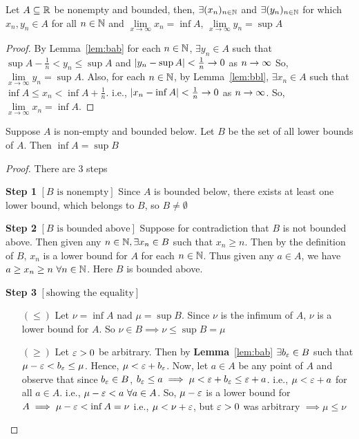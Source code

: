\begin{corollary}
    Let $A\subseteq \mathbb R$ be nonempty and bounded, then, $\exists(x_n)_{n\in\mathbb N}$ and $\exists(y_n)_{n\in\mathbb N}$ 
    for which $x_n, y_n \in A$ for all $n \in \mathbb N$ and
    $\lim\limits_{x \to \infty}x_n = \inf A$, $\lim\limits_{x \to \infty}y_n = \sup A$
\end{corollary}
\begin{proof}
    By Lemma~\ref{lem:bab} for each $n \in \mathbb N$, $\exists y_n \in A$ such that $\sup A - \frac{1}{n} < y_n \leq \sup A$ and 
    $|y_n - \sup A| < \frac{1}{n} \rightarrow 0$ as $n \rightarrow \infty$
    So, $\lim\limits_{x \to \infty}y_n = \sup A$.
    Also, for each $n \in \mathbb N$, by Lemma~\ref{lem:bbl}, $\exists x_n \in A$ such that $\inf A \leq x_n < \inf A + \frac{1}{n}$.
    i.e., $|x_n - \inf A| < \frac{1}{n} \rightarrow 0$ as $n \rightarrow \infty$. 
    So, $\lim\limits_{x \to \infty}x_n = \inf A$.
\end{proof}

\begin{lemma}
    Suppose $A$ is non-empty and bounded below.
    Let $B$ be the set of all lower bounds of $A$.
    Then $\inf A = \sup B$
\end{lemma}
\begin{proof}
There are 3 steps

\par\textbf{Step 1} $\left[B\text{ is nonempty}\right]$ 
Since $A$ is bounded below, there exists at least one lower bound, which belongs to $B$, so $B \neq \emptyset$

\par\textbf{Step 2} $\left[B\text{ is bounded above}\right]$ 
Suppose for contradiction that $B$ is not bounded above. 
Then given any $n \in \mathbb N, \exists x_n \in B$ such that $x_n \geq n$.
Then by the definition of $B$, $x_n$ is a lower bound for $A$ for each $n \in \mathbb N$.
Thus given any $a \in A$, we have $a \geq x_n \geq n\ \forall n \in \mathbb N$.
Here $B$ is bounded above.

\par\textbf{Step 3} $\left[\text{showing the equality}\right]$ 
\begin{itemize}
    \item[$(\leq)$] Let $\nu = \inf A$ nad $\mu = \sup B$.
    Since $\nu$ is the infimum of $A$, $\nu$ is a lower bound for $A$.
    So $\nu \in B \implies \nu \leq \sup B = \mu$ 
    \item[$(\geq)$] Let $\varepsilon > 0$ be arbitrary. Then by \textbf{Lemma}~\ref{lem:bab} $\exists b_\varepsilon \in B$ such that $\mu - \varepsilon < b_\varepsilon \leq \mu$.
    Hence, $\mu < \varepsilon + b_\varepsilon$. Now, let $a \in A$ be any point of $A$ and observe that since $b_\varepsilon \in B$, $b_\varepsilon \leq a \implies \mu < \varepsilon + b_\varepsilon \leq \varepsilon + a$.
    i.e., $\mu < \varepsilon + a$ for all $a \in A$.
    i.e., $\mu - \varepsilon < a\ \forall a \in A$.
    So, $\mu - \varepsilon$ is a lower bound for $A \implies \mu - \varepsilon < \inf A = \nu$
    i.e., $\mu < \nu + \varepsilon$, but $\varepsilon > 0$ was arbitrary $\implies \mu \leq \nu$
\end{itemize}

\end{proof}
